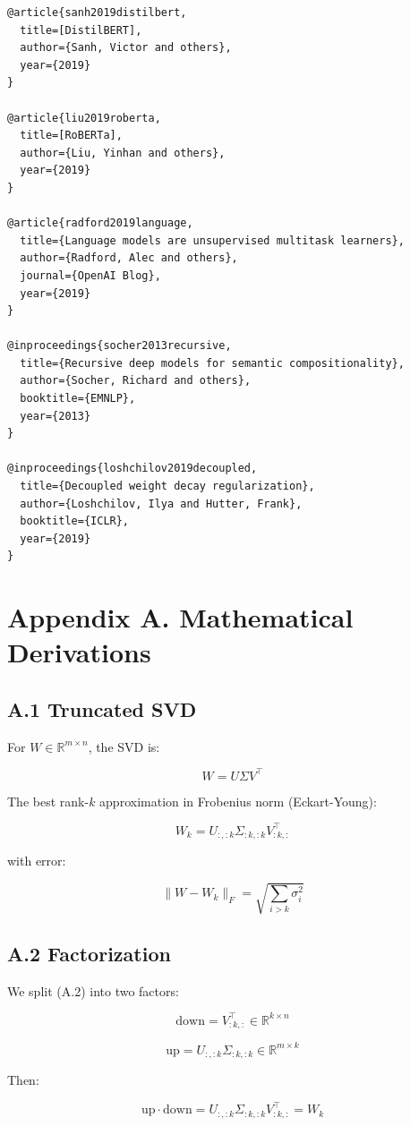 \begin{lstlisting}
@article{sanh2019distilbert,
  title=[DistilBERT],
  author={Sanh, Victor and others},
  year={2019}
}

@article{liu2019roberta,
  title=[RoBERTa],
  author={Liu, Yinhan and others},
  year={2019}
}

@article{radford2019language,
  title={Language models are unsupervised multitask learners},
  author={Radford, Alec and others},
  journal={OpenAI Blog},
  year={2019}
}

@inproceedings{socher2013recursive,
  title={Recursive deep models for semantic compositionality},
  author={Socher, Richard and others},
  booktitle={EMNLP},
  year={2013}
}

@inproceedings{loshchilov2019decoupled,
  title={Decoupled weight decay regularization},
  author={Loshchilov, Ilya and Hutter, Frank},
  booktitle={ICLR},
  year={2019}
}
\end{lstlisting}



\section{Appendix A. Mathematical Derivations}

\subsection{A.1 Truncated SVD}

For $W \in \mathbb{R}^{m \times n}$, the SVD is:

\[
W = U \Sigma V^\top
\]

The best rank-$k$ approximation in Frobenius norm (Eckart-Young):

\[
W_k = U_{:, :k} \Sigma_{:k, :k} V_{:k, :}^\top
\]

with error:

\[
\|W - W_k\|_F = \sqrt{\sum_{i > k} \sigma_i^2}
\]

\subsection{A.2 Factorization}

We split (A.2) into two factors:

\[
\text{down} = V_{:k, :}^\top \in \mathbb{R}^{k \times n}
\]

\[
\text{up} = U_{:, :k} \Sigma_{:k, :k} \in \mathbb{R}^{m \times k}
\]

Then:

\[
\text{up} \cdot \text{down} = U_{:, :k} \Sigma_{:k, :k} V_{:k, :}^\top = W_k
\]

